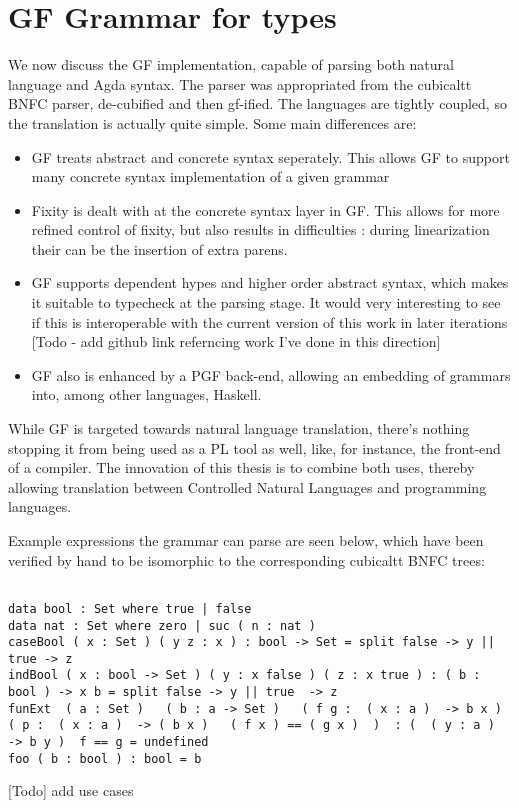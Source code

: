 
\section{GF Grammar for types}

We now discuss the GF implementation, capable of parsing both natural language
and Agda syntax. The parser was appropriated from the cubicaltt BNFC parser,
de-cubified and then gf-ified. The languages are tightly coupled, so the
translation is actually quite simple. Some main differences are:

\begin{itemize}[noitemsep]

\item GF treats abstract and concrete syntax seperately. This allows GF to
support many concrete syntax implementation of a given grammar

\item Fixity is dealt with at the concrete syntax layer in GF.  This allows for
more refined control of fixity, but also results in difficulties : during
linearization their can be the insertion of extra parens.

\item GF supports dependent hypes and higher order abstract syntax, which makes
it suitable to typecheck at the parsing stage. It would very interesting to see
if this is interoperable with the current version of this work in later
iterations [Todo - add github link referncing work I've done in this direction]

\item GF also is enhanced by a PGF back-end, allowing an embedding of grammars
into, among other languages, Haskell.

\end{itemize}

While GF is targeted towards natural language translation, there's nothing
stopping it from being used as a PL tool as well, like, for instance, the
front-end of a compiler. The innovation of this thesis is to combine both uses,
thereby allowing translation between Controlled Natural Languages and
programming languages.

Example expressions the grammar can parse are seen below, which have been
verified by hand to be isomorphic to the corresponding cubicaltt BNFC trees:

\begin{verbatim}

data bool : Set where true | false 
data nat : Set where zero | suc ( n : nat )  
caseBool ( x : Set ) ( y z : x ) : bool -> Set = split false -> y || true -> z
indBool ( x : bool -> Set ) ( y : x false ) ( z : x true ) : ( b : bool ) -> x b = split false -> y || true  -> z
funExt  ( a : Set )   ( b : a -> Set )   ( f g :  ( x : a )  -> b x )   ( p :  ( x : a )  -> ( b x )   ( f x ) == ( g x )  )  : (  ( y : a )  -> b y )  f == g = undefined
foo ( b : bool ) : bool = b

\end{verbatim}

[Todo] add use cases

